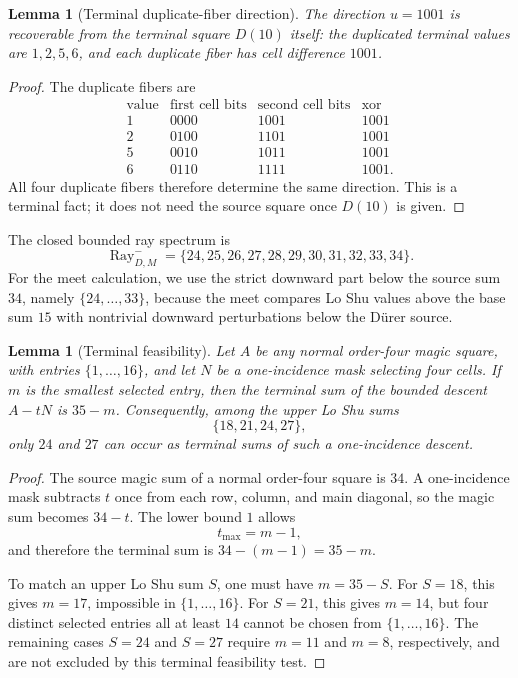 \documentclass[11pt,a4paper]{article}
\newtheorem{lemma}[theorem]{Lemma}
\theoremstyle{definition}
\theoremstyle{remark}
\newcommand{\Ray}{\operatorname{Ray}}
\newcommand{\Durer}{D\"urer\xspace}
\begin{document}
\begin{lemma}[Terminal duplicate-fiber direction]
\label{lem:terminal-duplicate-direction}
The direction \(u=1001\) is recoverable from the terminal square \(D(10)\)
itself: the duplicated terminal values are \(1,2,5,6\), and each duplicate
fiber has cell difference \(1001\).
\end{lemma}

\begin{proof}
The duplicate fibers are
\[
\begin{array}{c|c|c|c}
\text{value} & \text{first cell bits} & \text{second cell bits} & \text{xor}\\
\hline
1&0000&1001&1001\\
2&0100&1101&1001\\
5&0010&1011&1001\\
6&0110&1111&1001.
\end{array}
\]
All four duplicate fibers therefore determine the same direction.  This is a
terminal fact; it does not need the source square once \(D(10)\) is given.
\end{proof}

The closed bounded ray spectrum is
\[
\Ray^-_{D,M}=\{24,25,26,27,28,29,30,31,32,33,34\}.
\]
For the meet calculation, we use the strict downward part below the source
sum \(34\), namely \(\{24,\ldots,33\}\), because the meet compares Lo Shu
values above the base sum \(15\) with nontrivial downward perturbations below
the \Durer source.

\begin{lemma}[Terminal feasibility]
\label{lem:terminal-feasibility}
Let \(A\) be any normal order-four magic square, with entries
\(\{1,\ldots,16\}\), and let \(N\) be a one-incidence mask selecting four
cells.  If \(m\) is the smallest selected entry, then the terminal sum of the
bounded descent \(A-tN\) is \(35-m\).  Consequently, among the upper Lo Shu
sums
\[
\{18,21,24,27\},
\]
only \(24\) and \(27\) can occur as terminal sums of such a one-incidence
descent.
\end{lemma}

\begin{proof}
The source magic sum of a normal order-four square is \(34\).  A
one-incidence mask subtracts \(t\) once from each row, column, and main
diagonal, so the magic sum becomes \(34-t\).  The lower bound \(1\) allows
\[
t_{\max}=m-1,
\]
and therefore the terminal sum is \(34-(m-1)=35-m\).

To match an upper Lo Shu sum \(S\), one must have \(m=35-S\).  For
\(S=18\), this gives \(m=17\), impossible in \(\{1,\ldots,16\}\).  For
\(S=21\), this gives \(m=14\), but four distinct selected entries all at
least \(14\) cannot be chosen from \(\{1,\ldots,16\}\).  The remaining cases
\(S=24\) and \(S=27\) require \(m=11\) and \(m=8\), respectively, and are
not excluded by this terminal feasibility test.
\end{proof}
\end{document}

